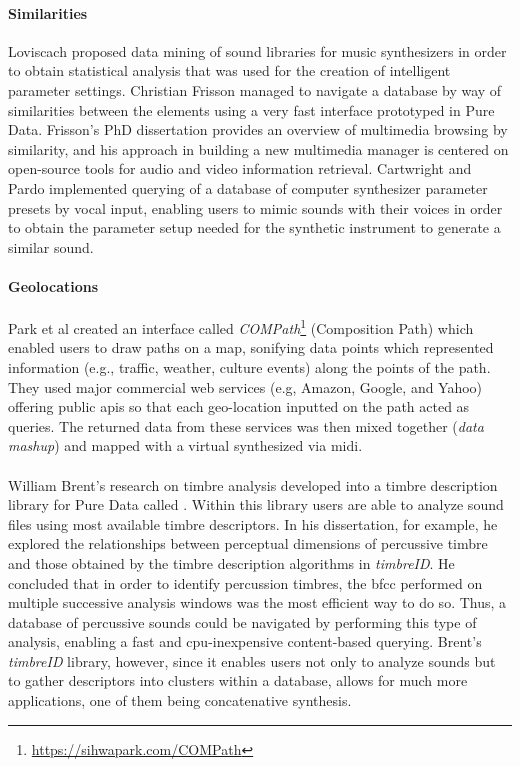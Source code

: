 \paragraph{Similarities}
Loviscach \parencite{Loviscach2008} proposed data mining of sound libraries for music synthesizers in order to obtain statistical analysis that was used for the creation of intelligent parameter settings. Christian Frisson \parencite{Frisson2010} managed to navigate a database by way of similarities between the elements using a very fast interface prototyped in Pure Data. Frisson's PhD dissertation \parencite{Frisson2015} provides an overview of multimedia browsing by similarity, and his approach in building a new multimedia manager is centered on open-source tools for audio and video information retrieval. Cartwright and Pardo \parencite{mcartwright:2014} implemented querying of a database of computer synthesizer parameter presets by vocal input, enabling users to mimic sounds with their voices in order to obtain the parameter setup needed for the synthetic instrument to generate a similar sound.

\paragraph{Geolocations}
Park et al \parencite{icmc/bbp2372.2010.002} created an interface called \textit{COMPath}\footnote{\url{https://sihwapark.com/COMPath}} (Composition Path) which enabled users to draw paths on a map, sonifying data points which represented information (e.g., traffic, weather, culture events) along the points of the path. They used major commercial web services (e.g, Amazon, Google, and Yahoo) offering public \glspl{api} so that each geo-location inputted on the path acted as queries. The returned data from these services was then mixed together (\textit{data mashup}) and mapped with a virtual synthesized via \gls{midi}.

\paragraph{}
William Brent's research on timbre analysis \parencite{Brent/2010/phdthesis} developed into a timbre description library for Pure Data called  \parencite{icmc/bbp2372.2010.044}. Within this library users are able to analyze sound files using most available timbre descriptors. In his dissertation, for example, he explored the relationships between perceptual dimensions of percussive timbre and those obtained by the timbre description algorithms in \textit{timbreID}. He concluded that in order to identify percussion timbres, the \gls{bfcc} performed on multiple successive analysis windows was the most efficient way to do so. Thus, a database of percussive sounds could be navigated by performing this type of analysis, enabling a fast and \gls{cpu}-inexpensive content-based querying. Brent's \textit{timbreID} library, however, since it enables users not only to analyze sounds but to gather descriptors into clusters within a database, allows for much more applications, one of them being concatenative synthesis.


